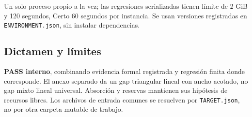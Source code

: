 \documentclass[11pt]{article}
\begin{document}
Un solo proceso propio a la vez; las regresiones serializadas tienen
límite de 2 GiB y 120 segundos, Certo 60 segundos por instancia. Se usan
versiones registradas en \nolinkurl{ENVIRONMENT.json}, sin instalar
dependencias.

\subsection{Dictamen y límites}\label{dictamen-y-luxedmites}

\textbf{PASS interno}, combinando evidencia formal registrada y
regresión finita donde corresponde. El anexo separado da un gap
triangular lineal con ancho acotado, no gap mixto lineal universal.
Absorción y reservas mantienen sus hipótesis de recursos libres. Los
archivos de entrada comunes se resuelven por \nolinkurl{TARGET.json}, no
por otra carpeta mutable de trabajo.
\end{document}
